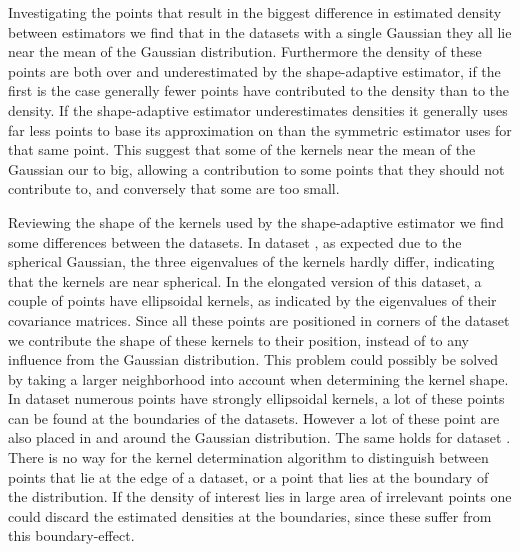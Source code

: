 		Investigating the points that result in the biggest difference in estimated density between estimators we find that in the datasets with a single Gaussian they all lie near the mean of the Gaussian distribution. Furthermore the density of these points are both over and underestimated by the shape-adaptive estimator, if the first is the case generally fewer points have contributed to the \mbe density than to the \sambe density. If the shape-adaptive estimator underestimates densities it generally uses far less points to base its approximation on than the symmetric estimator uses for that same point. This suggest that some of the kernels near the mean of the Gaussian our to big, allowing a contribution to some points that they should not contribute to, and conversely that some are too small. 

		Reviewing the shape of the kernels used by the shape-adaptive estimator we find some differences between the datasets. 
			In dataset \ferdosiOne, as expected due to the spherical Gaussian, the three eigenvalues of the kernels hardly differ, indicating that the kernels are near spherical. 
			In the elongated version of this dataset, a couple of points have ellipsoidal kernels, as indicated by the eigenvalues of their covariance matrices. Since all these points are positioned in corners of the dataset we contribute the shape of these kernels to their position, instead of to any influence from the Gaussian distribution. This problem could possibly be solved by taking a larger neighborhood into account when determining the kernel shape. 
			In dataset \baakmanFour numerous points have strongly ellipsoidal kernels, a lot of these points can be found at the boundaries of the datasets. However a lot of these point are also placed in and around the Gaussian distribution. 
			The same holds for dataset \baakmanFive.
		There is no way for the kernel determination algorithm to distinguish between points that lie at the edge of a dataset, or a point that lies at the boundary of the distribution. If the density of interest lies in large area of irrelevant points one could discard the estimated densities at the boundaries, since these suffer from this boundary-effect.
			
